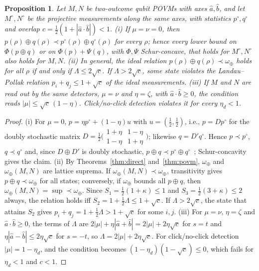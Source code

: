 \documentclass[aps,pra,twocolumn,superscriptaddress,nofootinbib,floatfix]{revtex4-2}
\newtheorem{proposition}{Proposition}
\theoremstyle{definition}
\newcommand{\maj}{\prec}
\newcommand{\omplus}{\omega_{\oplus}}
\newcommand{\sqc}{\sqrt{c}}
\begin{document}
\begin{proposition}
\label{prop:detectors}
Let $M,N$ be two-outcome qubit POVMs with axes $\hat a,\hat b$, and let
$M^\circ,N^\circ$ be the projective measurements along the same axes, with
statistics $p^\circ,q^\circ$ and overlap $c=\frac12(1+|\hat a\cdot\hat b|)<1$.
(i) If $\mu=\nu=0$, then $p(\rho)\oplus q(\rho)\maj p^\circ(\rho)\oplus q^\circ(\rho)$
for every $\rho$; hence every lower bound on $\Phi(p\oplus q)$ or on
$\Phi(p)+\Psi(q)$, with $\Phi,\Psi$ Schur-concave, that holds for
$M^\circ,N^\circ$ also holds for $M,N$.
(ii) In general, the ideal relation $p(\rho)\oplus q(\rho)\maj\omplus$ holds for
all $\rho$ if and only if $\Lambda\le2\sqc$. If $\Lambda>2\sqc$, some state violates
the Landau--Pollak relation $p_i+q_j\le1+\sqc$ of the ideal measurements.
(iii) If $M$ and $N$ are read out by the same detectors, $\mu=\nu$ and
$\eta=\zeta$, with $\hat a\cdot\hat b\ge0$, the condition reads
$|\mu|\le\sqc\,(1-\eta)$. Click/no-click detection violates it for every
$\eta_d<1$.
\end{proposition}

\begin{proof}
(i) For $\mu=0$, $p=\eta p^\circ+(1-\eta)u$ with $u=(\frac12,\frac12)$, i.e.,
$p=Dp^\circ$ for the doubly stochastic matrix
$D=\frac12\bigl(\begin{smallmatrix}1+\eta&1-\eta\\1-\eta&1+\eta\end{smallmatrix}\bigr)$;
likewise $q=D'q^\circ$. Hence $p\maj p^\circ$, $q\maj q^\circ$ and, since $D\oplus D'$
is doubly stochastic, $p\oplus q\maj p^\circ\oplus q^\circ$~\cite{MarshallOlkin2011};
Schur-concavity gives the claim. (ii) By Theorems~\ref{thm:direct}
and~\ref{thm:povm}, $\omplus$ and $\omplus(M,N)$ are lattice suprema. If
$\omplus(M,N)\maj\omplus$, transitivity gives $p\oplus q\maj\omplus$ for all states;
conversely, if $\omplus$ bounds all $p\oplus q$, then $\omplus(M,N)=\sup\maj\omplus$.
Since $S_1=\frac12(1+\kappa)\le1$ and $S_3=\frac12(3+\kappa)\le2$ always, the
relation holds iff $S_2=1+\frac12\Lambda\le1+\sqc$. If $\Lambda>2\sqc$, the state that
attains $S_2$ gives $p_i+q_j=1+\frac12\Lambda>1+\sqc$ for some $i,j$. (iii) For
$\mu=\nu$, $\eta=\zeta$ and $\hat a\cdot\hat b\ge0$, the terms of $\Lambda$ are
$2|\mu|+\eta|\hat a+\hat b|=2|\mu|+2\eta\sqc$ for $s=t$ and
$\eta|\hat a-\hat b|\le2\eta\sqc$ for $s=-t$, so $\Lambda=2|\mu|+2\eta\sqc$. For
click/no-click detection $|\mu|=1-\eta_d$, and the condition becomes
$(1-\eta_d)(1-\sqc)\le0$, which fails for $\eta_d<1$ and $c<1$.
\end{proof}
\end{document}
